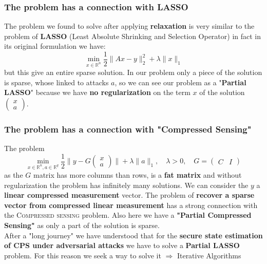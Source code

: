 \subsubsection{The problem has a connection with LASSO}
The problem we found to solve after applying \textbf{relaxation} is very similar to the problem of \textbf{LASSO} (Least Absolute Shrinking and Selection Operator) in fact in its original formulation we have: 
$$\min_{x\in\mathbb{R}^n} \frac{1}{2}\lVert Ax-y \rVert_2^2+\lambda\lVert x \rVert_1$$
but this give an entire sparse solution. In our problem only a piece of the solution is sparse, whose linked to attacks $a$, so we can see our problem as a "\textbf{Partial LASSO}" because we have \textbf{no regularization} on the term $x$ of the solution $\begin{pmatrix}
    x\\a
\end{pmatrix}$.

\subsubsection{The problem has a connection with "Compressed Sensing"}
The problem
 $$
    \min_{x\in\mathbb{R}^n, a\in\mathbb{R}^q}{\frac{1}{2}\Bigg\lVert y - G\begin{pmatrix}
        x\\
        a
    \end{pmatrix} \Bigg\rVert}+\lambda\lVert a \rVert_1, \quad \lambda>0,
    \quad 
    G=\begin{pmatrix}
        C & I 
    \end{pmatrix}
    $$
as the $G$ matrix has more columns than rows, is a \textbf{fat matrix} and without regularization the problem has infinitely many solutions. We can consider the $y$ a \textbf{linear compressed measurement} vector.
The problem of \textbf{recover a sparse vector from compressed linear measurement} has a strong connection with the \textsc{Compressed sensing} problem. Also here we have a \textbf{"Partial Compressed Sensing"} as only a part of the solution is sparse.\\

\noindent
{
\large{
    \color{red}
    After a "long journey" we have understood that for the \textbf{secure state estimation of CPS under adversarial attacks} we have to solve a \textbf{Partial LASSO} problem. For this reason we seek a way to solve it $\Rightarrow$ Iterative Algorithms
    }
}
    
